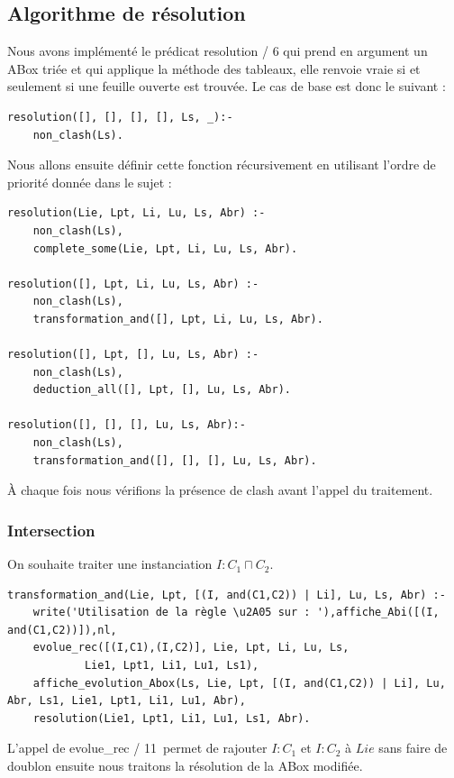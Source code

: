 \documentclass{article}
\begin{document}
\subsection{Algorithme de résolution}
Nous avons implémenté le prédicat \color{blue} resolution / 6 \color{black}  qui prend en argument un ABox triée et qui applique la méthode des tableaux, elle renvoie vraie si et seulement si une feuille ouverte est trouvée. Le cas de base est donc le suivant :
\begin{verbatim}
resolution([], [], [], [], Ls, _):-
	non_clash(Ls).
\end{verbatim}

Nous allons ensuite définir cette fonction récursivement en utilisant l'ordre de priorité donnée dans le sujet :
\begin{verbatim}
resolution(Lie, Lpt, Li, Lu, Ls, Abr) :-
    non_clash(Ls),
    complete_some(Lie, Lpt, Li, Lu, Ls, Abr).
	
resolution([], Lpt, Li, Lu, Ls, Abr) :-
    non_clash(Ls),
    transformation_and([], Lpt, Li, Lu, Ls, Abr).
	
resolution([], Lpt, [], Lu, Ls, Abr) :-
    non_clash(Ls),
    deduction_all([], Lpt, [], Lu, Ls, Abr).
	
resolution([], [], [], Lu, Ls, Abr):-
	non_clash(Ls),
	transformation_and([], [], [], Lu, Ls, Abr).
\end{verbatim}

À chaque fois nous vérifions la présence de clash avant l'appel du traitement.

\subsubsection{Intersection}
On souhaite traiter une instanciation $I:C_1\sqcap C_2$.
\begin{verbatim}
transformation_and(Lie, Lpt, [(I, and(C1,C2)) | Li], Lu, Ls, Abr) :- 
	write('Utilisation de la règle \u2A05 sur : '),affiche_Abi([(I, and(C1,C2))]),nl,
	evolue_rec([(I,C1),(I,C2)], Lie, Lpt, Li, Lu, Ls,
            Lie1, Lpt1, Li1, Lu1, Ls1),
	affiche_evolution_Abox(Ls, Lie, Lpt, [(I, and(C1,C2)) | Li], Lu, Abr, Ls1, Lie1, Lpt1, Li1, Lu1, Abr),
	resolution(Lie1, Lpt1, Li1, Lu1, Ls1, Abr).
\end{verbatim}

L'appel de \color{blue}evolue\_rec / 11\color{black}\ permet de rajouter $I:C_1$ et $I:C_2$ à $Lie$ sans faire de doublon ensuite nous traitons la résolution de la ABox modifiée.
\end{document}
